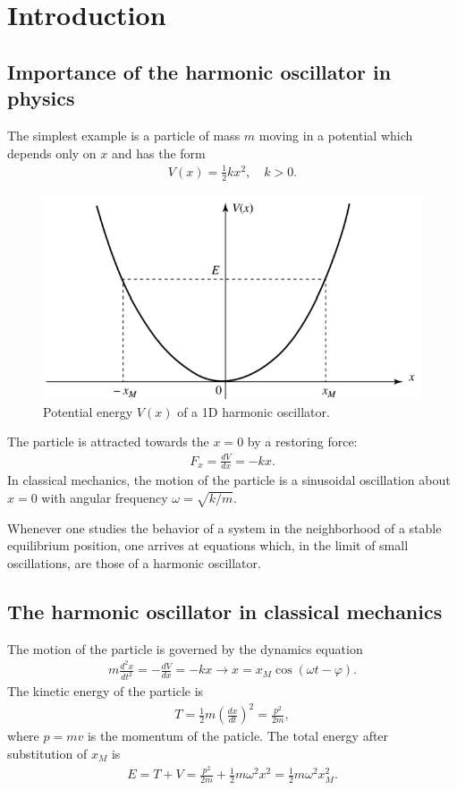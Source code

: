 \section{Introduction}
\subsection{Importance of the harmonic oscillator in physics}
The simplest example is a particle of mass $m$ moving in a potential which depends only on $x$ and has the form 
\begin{align*}
    V(x)=\frac{1}{2}kx^2,\quad k>0.
\end{align*}
\begin{figure}[h!]
    \centering
    \includegraphics[width=.5\columnwidth]{PartOne/ChapterThree/potentialharmonicoscillator.png}
    \caption{Potential energy $V(x)$ of a 1D harmonic oscillator.}
\end{figure}
The particle is attracted towards the $x=0$ by a restoring force:
\begin{align*}
    F_x=\frac{dV}{dx}=-kx.
\end{align*}
In classical mechanics, the motion of the particle is a sinusoidal oscillation about $x=0$ with angular frequency $\omega=\sqrt{k/m}$.

\begin{emphasizer}
    Whenever one studies the behavior of a system in the neighborhood of a stable equilibrium position, one arrives at equations which, 
    in the limit of small oscillations, are those of a harmonic oscillator.
\end{emphasizer}
\subsection{The harmonic oscillator in classical mechanics}
The motion of the particle is governed by the dynamics equation
\begin{align}
    m\frac{d^2x}{dt^2}=-\frac{dV}{dx}=-kx\longrightarrow x=x_M\cos(\omega t-\varphi).
\end{align}
The kinetic energy of the particle is 
\begin{align}
    T=\frac{1}{2}m\left(\frac{dx}{dt}\right)^2=\frac{p^2}{2m},
\end{align}
where $p=mv$ is the momentum of the paticle. The total energy after substitution of $x_M$ is
\begin{align*}
    E=T+V=\frac{p^2}{2m}+\frac{1}{2}m\omega^2x^2=\frac{1}{2}m\omega^2x^2_M.
\end{align*}


